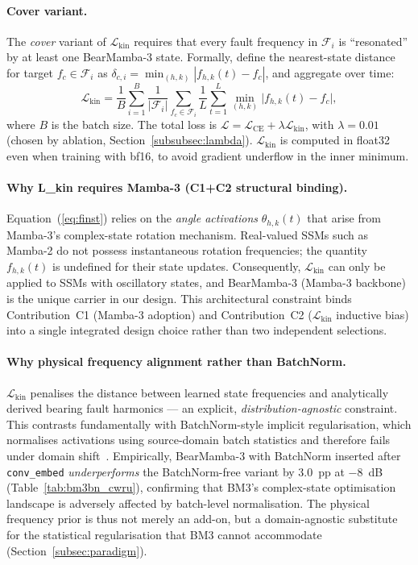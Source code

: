 \paragraph{Cover variant.}
The \emph{cover} variant of $\mathcal{L}_{\text{kin}}$ requires that every
fault frequency in $\mathcal{F}_i$ is ``resonated'' by at least one
BearMamba-3 state.
Formally, define the nearest-state distance for target $f_c \in \mathcal{F}_i$
as $\delta_{c,i} = \min_{(h,k)} |f_{h,k}(t) - f_c|$, and aggregate over time:
\begin{equation}
  \mathcal{L}_{\text{kin}}
    = \frac{1}{B} \sum_{i=1}^{B}
      \frac{1}{|\mathcal{F}_i|} \sum_{f_c \in \mathcal{F}_i}
        \frac{1}{L} \sum_{t=1}^{L} \min_{(h,k)}\bigl|f_{h,k}(t) - f_c\bigr|,
  \label{eq:lkin}
\end{equation}
where $B$ is the batch size.
The total loss is $\mathcal{L} = \mathcal{L}_{\text{CE}} + \lambda \mathcal{L}_{\text{kin}}$,
with $\lambda = 0.01$ (chosen by ablation, Section~\ref{subsubsec:lambda}).
$\mathcal{L}_{\text{kin}}$ is computed in float32 even when training with
bf16, to avoid gradient underflow in the inner minimum.

\paragraph{Why L\_kin requires Mamba-3 (C1+C2 structural binding).}
Equation~(\ref{eq:finst}) relies on the \emph{angle activations}
$\theta_{h,k}(t)$ that arise from Mamba-3's complex-state rotation mechanism.
Real-valued SSMs such as Mamba-2 do not possess instantaneous rotation
frequencies; the quantity $f_{h,k}(t)$ is undefined for their state updates.
Consequently, $\mathcal{L}_{\text{kin}}$ can only be applied to SSMs with
oscillatory states, and BearMamba-3 (Mamba-3 backbone) is the unique carrier
in our design.
This architectural constraint binds Contribution~C1 (Mamba-3 adoption) and
Contribution~C2 ($\mathcal{L}_{\text{kin}}$ inductive bias) into a single integrated design choice
rather than two independent selections.

\paragraph{Why physical frequency alignment rather than BatchNorm.}
$\mathcal{L}_{\text{kin}}$ penalises the distance between learned state
frequencies and analytically derived bearing fault harmonics — an explicit,
\emph{distribution-agnostic} constraint.
This contrasts fundamentally with BatchNorm-style implicit regularisation,
which normalises activations using source-domain batch statistics and therefore
fails under domain shift~\cite{li2017revisiting,peng2018domain}.
Empirically, BearMamba-3 with BatchNorm inserted after \texttt{conv\_embed}
\emph{underperforms} the BatchNorm-free variant by $3.0$~pp at $-8$~dB
(Table~\ref{tab:bm3bn_cwru}), confirming that BM3's complex-state optimisation
landscape is adversely affected by batch-level normalisation.
The physical frequency prior is thus not merely an add-on, but a
domain-agnostic substitute for the statistical regularisation that BM3
cannot accommodate (Section~\ref{subsec:paradigm}).


